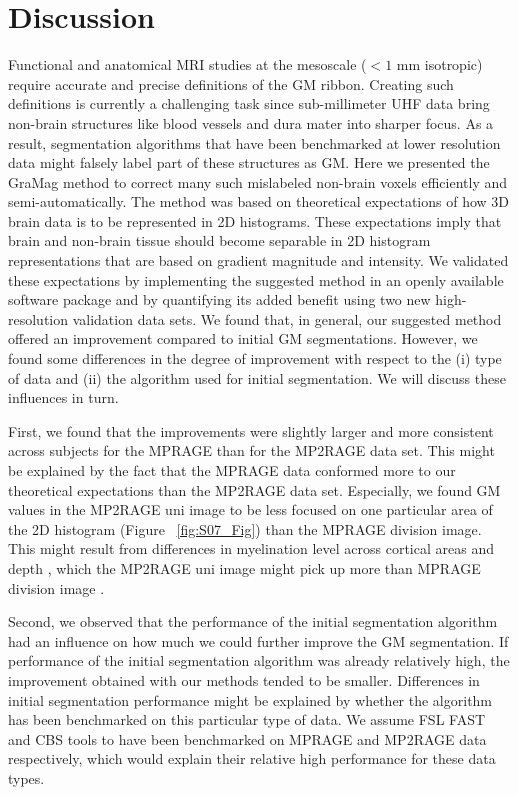 \section{Discussion}
\label{sec:Discussion}
Functional and anatomical MRI studies at the mesoscale ($< 1$ mm isotropic) require accurate and precise definitions of the GM ribbon. Creating such definitions is currently a challenging task since sub-millimeter UHF data bring non-brain structures like blood vessels and dura mater into sharper focus. As a result, segmentation algorithms that have been benchmarked at lower resolution data might falsely label part of these structures as GM. Here we presented the GraMag method to correct many such mislabeled non-brain voxels efficiently and semi-automatically. The method was based on theoretical expectations of how 3D brain data is to be represented in 2D histograms. These expectations imply that brain and non-brain tissue should become separable in 2D histogram representations that are based on gradient magnitude and intensity. We validated these expectations by implementing the suggested method in an openly available software package and by quantifying its added benefit using two new high-resolution validation data sets. We found that, in general, our suggested method offered an improvement compared to initial GM segmentations. However, we found some differences in the degree of improvement with respect to the (i) type of data and (ii) the algorithm used for initial segmentation. We will discuss these influences in turn.

First, we found that the improvements were slightly larger and more consistent across subjects for the MPRAGE than for the MP2RAGE data set. This might be explained by the fact that the MPRAGE data conformed more to our theoretical expectations than the MP2RAGE data set. Especially, we found GM values in the MP2RAGE uni image to be less focused on one particular area of the 2D histogram (Figure ~\ref{fig:S07_Fig}) than the MPRAGE division image. This might result from differences in myelination level across cortical areas and depth \parencite{Sereno2013, Dick2012, DeMartino2015myelin}, which the MP2RAGE uni image might pick up more than MPRAGE division image \parencite{Marques2013}.

Second, we observed that the performance of the initial segmentation algorithm had an influence on how much we could further improve the GM segmentation. If performance of the initial segmentation algorithm was already relatively high, the improvement obtained with our methods tended to be smaller. Differences in initial segmentation performance might be explained by whether the algorithm has been benchmarked on this particular type of data. We assume FSL FAST and CBS tools to have been benchmarked on MPRAGE and MP2RAGE data respectively, which would explain their relative high performance for these data types.

